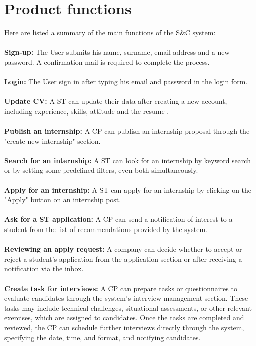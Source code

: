 \section{Product functions}
\label{sec:product_functions}%
Here are listed a summary of the main functions of the S\&C system:\\\\
\textbf{ Sign-up:} The User submits his name, surname, email address and a new password. A confirmation mail is required to complete the process.\\\\
\textbf{ Login:} The User sign in after typing his email and password in the login form. \\\\  
\textbf{ Update CV:} A ST can update their data after creating a new account, including experience, skills, attitude and the resume .\\\\
\textbf{ Publish an internship:} A CP can publish an internship proposal through  the "create new internship" section.\\\\
\textbf{ Search for an internship:} A ST can look for an internship by keyword search or by setting some predefined filters, even both simultaneously.\\\\
\textbf{ Apply for an internship:} A ST can apply for an internship by clicking on the "Apply" button on an internship post.\\\\
\textbf{ Ask for a ST application: } A CP can send a notification of interest to a student from the list of recommendations provided by the system.\\\\
\textbf{ Reviewing an apply request:} A company can decide whether to accept or reject a student's application from the application section or after receiving a notification via the inbox.\\\\
\textbf{ Create task for interviews:}  A CP can prepare tasks or questionnaires to evaluate candidates through the system's interview management section. These tasks may include technical challenges, situational assessments, or other relevant exercises, which are assigned to candidates. Once the tasks are completed and reviewed, the CP can schedule further interviews directly through the system, specifying the date, time, and format, and notifying candidates. \\\\
